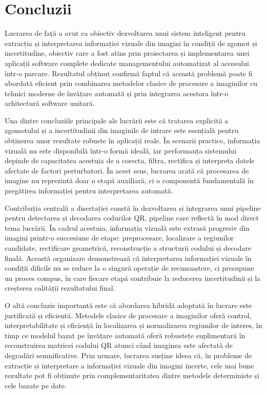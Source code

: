 \section{Concluzii}

Lucrarea de față a avut ca obiectiv dezvoltarea unui sistem inteligent pentru extracția și interpretarea informației vizuale din imagini în condiții de zgomot și incertitudine, obiectiv care a fost atins prin proiectarea și implementarea unei aplicații software complete dedicate managementului automatizat al accesului într-o parcare. Rezultatul obținut confirmă faptul că această problemă poate fi abordată eficient prin combinarea metodelor clasice de procesare a imaginilor cu tehnici moderne de învățare automată și prin integrarea acestora într-o arhitectură software unitară.

Una dintre concluziile principale ale lucrării este că tratarea explicită a zgomotului și a incertitudinii din imaginile de intrare este esențială pentru obținerea unor rezultate robuste în aplicații reale. În scenarii practice, informația vizuală nu este disponibilă într-o formă ideală, iar performanța sistemului depinde de capacitatea acestuia de a corecta, filtra, rectifica și interpreta datele afectate de factori perturbatori. În acest sens, lucrarea arată că procesarea de imagine nu reprezintă doar o etapă auxiliară, ci o componentă fundamentală în pregătirea informației pentru interpretarea automată.

Contribuția centrală a disertației constă în dezvoltarea și integrarea unui pipeline pentru detectarea și decodarea codurilor QR, pipeline care reflectă în mod direct tema lucrării. În cadrul acestuia, informația vizuală este extrasă progresiv din imagini printr-o succesiune de etape: preprocesare, localizare a regiunilor candidate, rectificare geometrică, reconstrucție a structurii codului și decodare finală. Această organizare demonstrează că interpretarea informației vizuale în condiții dificile nu se reduce la o singură operație de recunoaștere, ci presupune un proces compus, în care fiecare etapă contribuie la reducerea incertitudinii și la creșterea calității rezultatului final.

O altă concluzie importantă este că abordarea hibridă adoptată în lucrare este justificată și eficientă. Metodele clasice de procesare a imaginilor oferă control, interpretabilitate și eficiență în localizarea și normalizarea regiunilor de interes, în timp ce modelul bazat pe învățare automată oferă robustețe suplimentară în reconstruirea matricei codului QR atunci când imaginea este afectată de degradări semnificative. Prin urmare, lucrarea susține ideea că, în probleme de extracție și interpretare a informației vizuale din imagini incerte, cele mai bune rezultate pot fi obținute prin complementaritatea dintre metodele deterministe și cele bazate pe date.

